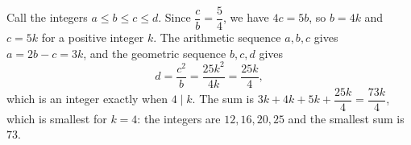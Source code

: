 Call the integers $a\le b\le c\le d$. Since $\dfrac cb=\dfrac54$, we have $4c=5b$, so $b=4k$ and $c=5k$ for a positive integer $k$. The arithmetic sequence $a,b,c$ gives $a=2b-c=3k$, and the geometric sequence $b,c,d$ gives
\[d=\dfrac{c^2}{b}=\dfrac{25k^2}{4k}=\dfrac{25k}{4},\]
which is an integer exactly when $4\mid k$. The sum is $3k+4k+5k+\dfrac{25k}4=\dfrac{73k}{4}$, which is smallest for $k=4$: the integers are $12,16,20,25$ and the smallest sum is $\boxed{73}$.

